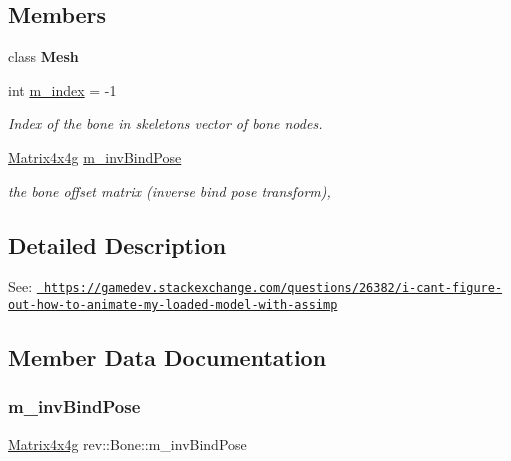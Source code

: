 \subsection*{Members}
\begin{DoxyCompactItemize}
\item 
\mbox{\label{classrev_1_1_bone_aa41a130f156b145bffb3f4b5172c4c93}} 
class {\bfseries Mesh}
\item 
\mbox{\label{classrev_1_1_bone_ac9aadb07d0f705ed59bb01197371fd5d}} 
int \mbox{\hyperlink{classrev_1_1_bone_ac9aadb07d0f705ed59bb01197371fd5d}{m\+\_\+index}} = -\/1
\begin{DoxyCompactList}\small\item\em Index of the bone in skeleton\textquotesingle{}s vector of bone nodes. \end{DoxyCompactList}\item 
\mbox{\hyperlink{classrev_1_1_square_matrix}{Matrix4x4g}} \mbox{\hyperlink{classrev_1_1_bone_a972d9c9bf9e1f019c5ce5aeece19a703}{m\+\_\+inv\+Bind\+Pose}}
\begin{DoxyCompactList}\small\item\em the bone offset matrix (inverse bind pose transform), \end{DoxyCompactList}\end{DoxyCompactItemize}


\subsection{Detailed Description}
See\+: \href{https://gamedev.stackexchange.com/questions/26382/i-cant-figure-out-how-to-animate-my-loaded-model-with-assimp}{\texttt{ https\+://gamedev.\+stackexchange.\+com/questions/26382/i-\/cant-\/figure-\/out-\/how-\/to-\/animate-\/my-\/loaded-\/model-\/with-\/assimp}} 

\subsection{Member Data Documentation}
\mbox{\label{classrev_1_1_bone_a972d9c9bf9e1f019c5ce5aeece19a703}} 
\subsubsection{\texorpdfstring{m\_invBindPose}{m\_invBindPose}}
{\footnotesize\ttfamily \mbox{\hyperlink{classrev_1_1_square_matrix}{Matrix4x4g}} rev\+::\+Bone\+::m\+\_\+inv\+Bind\+Pose}



